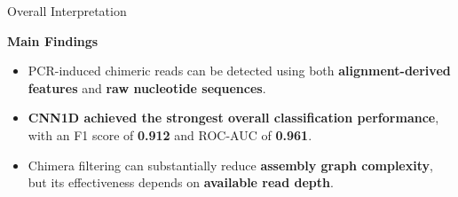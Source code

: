 \documentclass[aspectratio=169,11pt]{beamer}
\begin{document}
\begin{frame}{Overall Interpretation}

\vspace{0.15cm}

{\large\color{mitoblue}\textbf{Main Findings}}

\vspace{0.30cm}

\begin{itemize}

    \setlength{\itemsep}{0.32cm}

    \item
    PCR-induced chimeric reads can be detected using both
    \textbf{alignment-derived features} and
    \textbf{raw nucleotide sequences}.

    \item
    \textbf{CNN1D achieved the strongest overall classification performance},
    with an F1 score of \textbf{0.912} and ROC-AUC of \textbf{0.961}.

    \item
    Chimera filtering can substantially reduce
    \textbf{assembly graph complexity}, but its effectiveness
    depends on \textbf{available read depth}.

\end{itemize}








\end{frame}

\end{document}
